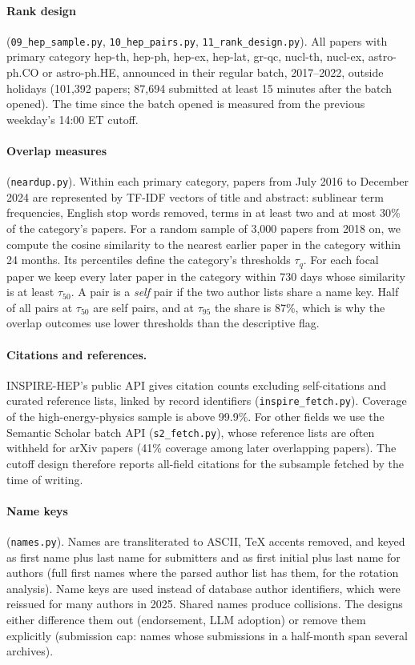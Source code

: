 \paragraph{Rank design} (\texttt{09\_hep\_sample.py}, \texttt{10\_hep\_pairs.py},
\texttt{11\_rank\_design.py}). All papers with primary category hep-th, hep-ph,
hep-ex, hep-lat, gr-qc, nucl-th, nucl-ex, astro-ph.CO or astro-ph.HE, announced
in their regular batch, 2017--2022, outside holidays (101,392 papers; 87,694
submitted at least 15 minutes after the batch opened). The time since the batch
opened is measured from the previous weekday's 14:00 ET cutoff.

\paragraph{Overlap measures} (\texttt{neardup.py}). Within each primary category,
papers from July 2016 to December 2024 are represented by TF-IDF vectors of title
and abstract: sublinear term frequencies, English stop words removed, terms in at
least two and at most 30\% of the category's papers. For a random sample of
3,000 papers from 2018 on, we compute the cosine similarity to the nearest
earlier paper in the category within 24 months. Its percentiles define the
category's thresholds $\tau_q$. For each focal paper we keep every later paper in
the category within 730 days whose similarity is at least $\tau_{50}$. A pair is
a \emph{self} pair if the two author lists share a name key. Half of all pairs at
$\tau_{50}$ are self pairs, and at $\tau_{95}$ the share is 87\%, which is why
the overlap outcomes use lower thresholds than the descriptive flag.

\paragraph{Citations and references.} INSPIRE-HEP's public API gives citation
counts excluding self-citations and curated reference lists, linked by record
identifiers (\texttt{inspire\_fetch.py}). Coverage of the high-energy-physics
sample is above 99.9\%. For other fields we use the Semantic Scholar batch API
(\texttt{s2\_fetch.py}), whose reference lists are often withheld for arXiv
papers (41\% coverage among later overlapping papers). The cutoff design
therefore reports all-field citations for the subsample fetched by the time of
writing.

\paragraph{Name keys} (\texttt{names.py}). Names are transliterated to ASCII, TeX
accents removed, and keyed as first name plus last name for submitters and as
first initial plus last name for authors (full first names where the parsed
author list has them, for the rotation analysis). Name keys are used instead of
database author identifiers, which were reissued for many authors in 2025. Shared
names produce collisions. The designs either difference them out (endorsement,
LLM adoption) or remove them explicitly (submission cap: names whose submissions
in a half-month span several archives).

